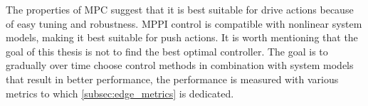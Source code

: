 
The properties of \ac{MPC} suggest that it is best suitable for drive actions because of easy tuning and robustness. \Ac{MPPI} control is compatible with nonlinear system models, making it best suitable for push actions. It is worth mentioning that the goal of this thesis is not to find the best optimal controller. The goal is to gradually over time choose control methods in combination with system models that result in better performance, the performance is measured with various metrics to which \cref{subsec:edge_metrics} is dedicated.\bs
